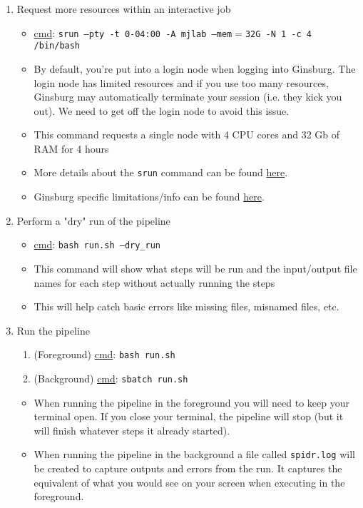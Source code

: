 \documentclass{article}
\begin{document}
\begin{enumerate}
        \item Request more resources within an interactive job
        \begin{itemize}
            \item \underline{cmd}: \texttt{srun --pty -t 0-04:00 -A mjlab --mem$=$32G -N 1 -c 4 /bin/bash}
            \item By default, you're put into a login node when logging into Ginsburg. The login node has limited resources and if you use too many resources, Ginsburg may automatically terminate your session (i.e. they kick you out). We need to get off the login node to avoid this issue.
            \item This command requests a single node with 4 CPU cores and 32 Gb of RAM for 4 hours
            \item More details about the \texttt{srun} command can be found \href{https://slurm.schedmd.com/srun.html}{here}.
            \item Ginsburg specific limitations/info can be found \href{https://columbiauniversity.atlassian.net/wiki/spaces/rcs/pages/62141877/Ginsburg+HPC+Cluster+User+Documentation}{here}.
        \end{itemize}

        \item Perform a "dry" run of the pipeline
        \begin{itemize}
            \item \underline{cmd}: \texttt{bash run.sh --dry\_run}
            \item This command will show what steps will be run and the input/output file names for each step without actually running the steps
            \item This will help catch basic errors like missing files, misnamed files, etc.
        \end{itemize}

        \item Run the pipeline
            \begin{enumerate}
                \item (Foreground) \underline{cmd}: \texttt{bash run.sh}
                \item (Background) \underline{cmd}: \texttt{sbatch run.sh}
            \end{enumerate}
        \begin{itemize}
            \item When running the pipeline in the foreground you will need to keep your terminal open. If you close your terminal, the pipeline will stop (but it will finish whatever steps it already started).
            \item When running the pipeline in the background a file called \texttt{spidr.log} will be created to capture outputs and errors from the run. It captures the equivalent of what you would see on your screen when executing in the foreground.
        \end{itemize}
    \end{enumerate}
\end{document}
